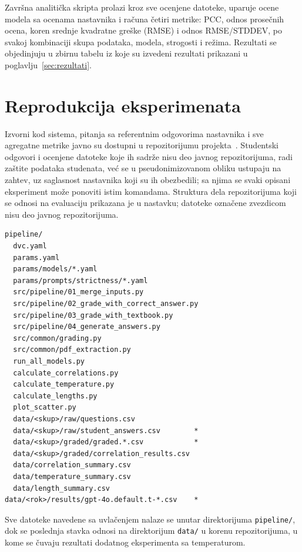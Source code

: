 Završna analitička skripta prolazi kroz sve ocenjene datoteke,
uparuje ocene modela sa ocenama nastavnika i računa četiri metrike:
PCC, odnos prosečnih ocena, koren srednje kvadratne greške (RMSE) i odnos RMSE/STDDEV,
po svakoj kombinaciji skupa podataka, modela, strogosti i režima.
Rezultati se objedinjuju u zbirnu tabelu iz koje su izvedeni rezultati prikazani u poglavlju~\ref{sec:rezultati}.

\section{Reprodukcija eksperimenata}
\label{sec:reprodukcija}

Izvorni kod sistema, pitanja sa referentnim odgovorima nastavnika i sve agregatne metrike javno su dostupni
u repozitorijumu projekta~\cite{ikovic2026edugraderrepo}.
Studentski odgovori i ocenjene datoteke koje ih sadrže nisu deo javnog repozitorijuma, radi zaštite podataka studenata,
već se u pseudonimizovanom obliku ustupaju na zahtev, uz saglasnost nastavnika koji su ih obezbedili;
sa njima se svaki opisani eksperiment može ponoviti istim komandama.
Struktura dela repozitorijuma koji se odnosi na evaluaciju prikazana je u nastavku;
datoteke označene zvezdicom nisu deo javnog repozitorijuma.

\begin{tcolorbox}[promptbox, title={Organizacija evaluacione infrastrukture}]
\begin{verbatim}
pipeline/
  dvc.yaml
  params.yaml
  params/models/*.yaml
  params/prompts/strictness/*.yaml
  src/pipeline/01_merge_inputs.py
  src/pipeline/02_grade_with_correct_answer.py
  src/pipeline/03_grade_with_textbook.py
  src/pipeline/04_generate_answers.py
  src/common/grading.py
  src/common/pdf_extraction.py
  run_all_models.py
  calculate_correlations.py
  calculate_temperature.py
  calculate_lengths.py
  plot_scatter.py
  data/<skup>/raw/questions.csv
  data/<skup>/raw/student_answers.csv        *
  data/<skup>/graded/graded.*.csv            *
  data/<skup>/graded/correlation_results.csv
  data/correlation_summary.csv
  data/temperature_summary.csv
  data/length_summary.csv
data/<rok>/results/gpt-4o.default.t-*.csv    *
\end{verbatim}
\end{tcolorbox}

Sve datoteke navedene sa uvlačenjem nalaze se unutar direktorijuma \texttt{pipeline/},
dok se poslednja stavka odnosi na direktorijum \texttt{data/} u korenu repozitorijuma,
u kome se čuvaju rezultati dodatnog eksperimenta sa temperaturom.

